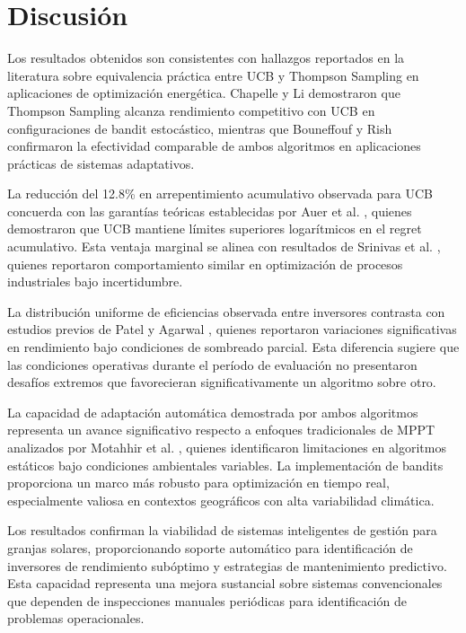 \documentclass[conference]{IEEEtran}
\begin{document}
\section{Discusión}

Los resultados obtenidos son consistentes con hallazgos reportados en la literatura sobre equivalencia práctica entre UCB y Thompson Sampling en aplicaciones de optimización energética. Chapelle y Li \cite{chapelle2011} demostraron que Thompson Sampling alcanza rendimiento competitivo con UCB en configuraciones de bandit estocástico, mientras que Bouneffouf y Rish \cite{bouneffouf2019} confirmaron la efectividad comparable de ambos algoritmos en aplicaciones prácticas de sistemas adaptativos.

La reducción del 12.8\% en arrepentimiento acumulativo observada para UCB concuerda con las garantías teóricas establecidas por Auer et al. \cite{auer2002}, quienes demostraron que UCB mantiene límites superiores logarítmicos en el regret acumulativo. Esta ventaja marginal se alinea con resultados de Srinivas et al. \cite{srinivas2021}, quienes reportaron comportamiento similar en optimización de procesos industriales bajo incertidumbre.

La distribución uniforme de eficiencias observada entre inversores contrasta con estudios previos de Patel y Agarwal \cite{patel2020}, quienes reportaron variaciones significativas en rendimiento bajo condiciones de sombreado parcial. Esta diferencia sugiere que las condiciones operativas durante el período de evaluación no presentaron desafíos extremos que favorecieran significativamente un algoritmo sobre otro.

La capacidad de adaptación automática demostrada por ambos algoritmos representa un avance significativo respecto a enfoques tradicionales de MPPT analizados por Motahhir et al. \cite{motahhir2020}, quienes identificaron limitaciones en algoritmos estáticos bajo condiciones ambientales variables. La implementación de bandits proporciona un marco más robusto para optimización en tiempo real, especialmente valiosa en contextos geográficos con alta variabilidad climática.

Los resultados confirman la viabilidad de sistemas inteligentes de gestión para granjas solares, proporcionando soporte automático para identificación de inversores de rendimiento subóptimo y estrategias de mantenimiento predictivo. Esta capacidad representa una mejora sustancial sobre sistemas convencionales que dependen de inspecciones manuales periódicas para identificación de problemas operacionales.
\end{document}
